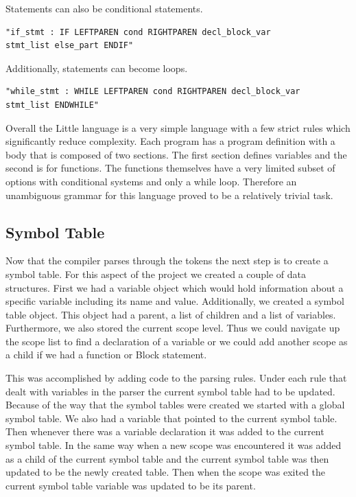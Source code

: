 \documentclass[12pt]{article}
\begin{document}
            Statements can also be conditional statements.
            \begin{verbatim}
"if_stmt : IF LEFTPAREN cond RIGHTPAREN decl_block_var
stmt_list else_part ENDIF"
            \end{verbatim}  
           
            Additionally, statements can become loops.
            \begin{verbatim}
"while_stmt : WHILE LEFTPAREN cond RIGHTPAREN decl_block_var
stmt_list ENDWHILE"
            \end{verbatim}
           
            
            Overall the Little language is a very simple language with a few strict rules which significantly reduce complexity.  Each program has a program definition with a body that is composed of two sections.  The first section defines variables and the second is for functions.  The functions themselves have a very limited subset of options with conditional systems and only a while loop.  Therefore an unambiguous grammar for this language proved to be a relatively trivial task.  
            

        \subsection{Symbol Table}
            Now that the compiler parses through the tokens the next step is to create a symbol table.  For this aspect of the project we created a couple of data structures.  First we had a variable object which would hold information about a specific variable including its name and value.  Additionally, we created a symbol table object.  This object had a parent, a list of children and a list of variables.  Furthermore, we also stored the current scope level.  Thus we could navigate up the scope list to find a declaration of a variable or we could add another scope as a child if we had a function or Block statement.  
            
            This was accomplished by adding code to the parsing rules.  Under each rule that dealt with variables in the parser the current symbol table had to be updated.  Because of the way that the symbol tables were created we started with a global symbol table.  We also had a variable that pointed to the current symbol table.  Then whenever there was a variable declaration it was added to the current symbol table.  In the same way when a new scope was encountered it was added as a child of the current symbol table and the current symbol table was then updated to be the newly created table.  Then when the scope was exited the current symbol table variable was updated to be its parent. 
            
\end{document}
